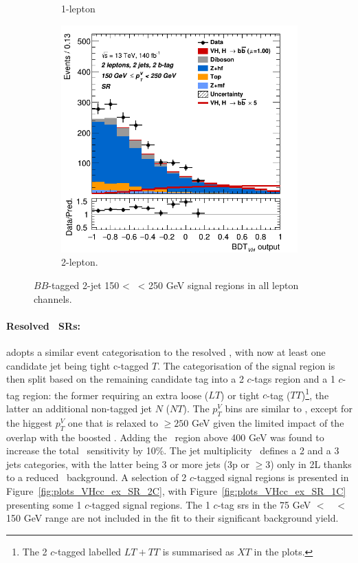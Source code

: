 \begin{figure}[h!]
\begin{subfigure}[b]{0.32\textwidth}
      \caption{1-lepton}
      \label{fig:plots_VHbb_ex_1L_SR}
  \end{subfigure}
  \begin{subfigure}[b]{0.32\textwidth}
    \centering
    \includegraphics[width=\textwidth]{Images/VH/Own_fit/prefit_VHbb/Region_distmva_BMax250_BMin150_DSR_J2_TTypebb_T2_L2_Y6051_Prefit.png}
    \caption{2-lepton.}
    \label{fig:plots_VHbb_ex_2L_SR}
\end{subfigure}
  \caption{$BB$-tagged 2-jet 150 < \ptv\ < 250 GeV signal regions in all lepton channels.}
  \label{fig:plots_VHbb_ex_SR}
\end{figure} 


\paragraph{Resolved \boldvhc\ SRs:} adopts a similar event categorisation to the resolved \vhb, with now at least one candidate jet being tight c-tagged $T$. The categorisation of the signal region is then split based on the remaining candidate tag into a 2 $c$-tags region and a 1 $c$-tag region: the former requiring an extra loose ($LT$) or tight $c$-tag ($TT$)\footnote{ The 2 $c$-tagged labelled $LT+TT$ is summarised as $XT$ in the plots.}, the latter an additional non-tagged jet $N$ ($NT$). The $p_T^V$ bins are similar to \vhb, except for the higgest $p_T^V$ one that is relaxed to $\geq 250$ GeV given the limited impact of the overlap with the boosted \vhb. Adding the \ptv\ region above 400 GeV was found to increase the total \vhc\ sensitivity by 10\%. The jet multiplicity \nj\ defines a 2 and a 3 jets categories, with the latter being 3 or more jets (3p or $\geq$3) only in 2L thanks to a reduced \ttb\ background. A selection of 2 $c$-tagged signal regions is presented in Figure~\ref{fig:plots_VHcc_ex_SR_2C}, with Figure~\ref{fig:plots_VHcc_ex_SR_1C} presenting some 1 $c$-tagged signal regions. The 1 $c$-tag \gls{sr}s in the 75 GeV $<$ \ptv\ $<$ 150 GeV range are not included in the fit to their significant background yield.

